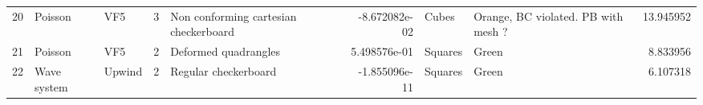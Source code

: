\begin{tabular}{lllrlrllr}
20 &           Poisson &                   VF5 &               3 &     Non conforming cartesian checkerboard & -8.672082e-02 &                 Cubes &  Orange, BC violated. PB with mesh ? &           13.945952 \\
21 &           Poisson &                   VF5 &               2 &                      Deformed quadrangles &  5.498576e-01 &               Squares &                                Green &            8.833956 \\
22 &       Wave system &                Upwind &               2 &                      Regular checkerboard & -1.855096e-11 &               Squares &                                Green &            6.107318 \\
\bottomrule
\end{tabular}
